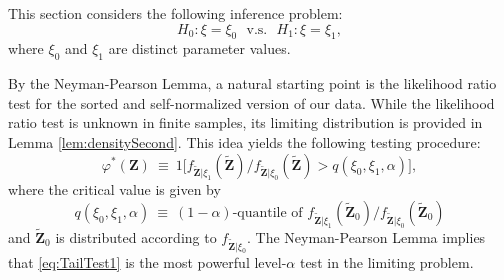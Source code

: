 This section considers the following inference problem:
\begin{equation}
H_{0}:\xi =\xi _{0}~~~\text{v.s.}~~~H_{1}:\xi =\xi _{1},  \label{eq:HT1}
\end{equation}
where $\xi _{0}$ and $\xi _{1}$ are distinct parameter values. 

By the Neyman-Pearson Lemma, a natural starting point is the likelihood ratio test for the sorted and self-normalized version of our data. While the likelihood ratio test is unknown in finite samples, its limiting distribution is provided in Lemma \ref{lem:densitySecond}. This idea yields the following testing procedure:
\begin{equation}
{\varphi}^{\ast }( \mathbf{{Z}}) 
~\equiv ~1\big[ {f_{\mathbf{\tilde{Z}}|\xi _{1}}( \mathbf{\tilde{Z}}) }/{f_{\mathbf{\tilde{Z}}|\xi _{0}}( \mathbf{\tilde{Z}}) }>q( \xi_{0},\xi _{1},\alpha ) \big] ,  \label{eq:TailTest1}
\end{equation}
where the critical value is given by
\begin{equation*}
q( \xi _{0},\xi _{1},\alpha ) ~\equiv ~( 1-\alpha )\text{-quantile of }{f_{\mathbf{\tilde{Z}}|\xi _{1}}( \mathbf{\tilde{Z}}_{0}) }/{f_{\mathbf{\tilde{Z}}|\xi _{0}}( \mathbf{\tilde{Z}}_{0}) }
\end{equation*}
and $\mathbf{\tilde{Z}}_{0}$ is distributed according to $f_{\mathbf{\tilde{Z}}|\xi _{0}}$. The Neyman-Pearson Lemma implies that \eqref{eq:TailTest1} is the most powerful level-$\alpha $ test in the limiting problem. 

